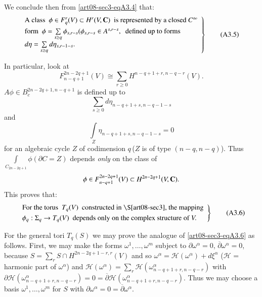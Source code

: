 We conclude then from \eqref{art08-sec3-eqA3.4} that:
\begin{equation*}
\left.
\begin{array}{@{}l}
\text{A class~ } \phi\in F^{r}_{q}(V)\subset H^{r}(V,\bfC)\text{~ is represented by a closed } C^{\infty}\\[4pt]
\text{form~ } \phi=\sum\limits_{s\geq q}\phi_{s,r-s}(\phi_{s,r-s}\in A^{s,r-s},\text{~ defined up to forms}\\[4pt]
d\eta=\sum\limits_{s\geq q}d\eta_{s,r-1-s}. 
\end{array}
\right\}\tag{A3.5}\label{art08-sec3-eqA3.5}
\end{equation*}

In particular, look at 
$$
F^{2n-2q+1}_{n-q+1}(V)\cong \sum\limits_{r\geq 0}H^{n-q+1+r,n-q-r}(V).
$$ 
$A\phi \in B^{2n-2q+1,n-q+1}_{c}$ is defined up to 
$$
\sum\limits_{s\geq 0}d\eta_{n-q+1+s,n-q-1-s}
$$ 
and 
$$
\int\limits_{Z}\eta_{n-q+1+s,n-q-1-s}=0
$$ 
for an algebraic cycle $Z$ of codimension $q$\,($Z$ is of type $(n-q,n-q)$). Thus $\int\limits_{C_{2n-2q+1}}\phi(\partial C=Z)$ depends {\em only} on the class of 
$$
\phi\in F^{2n-2q+1}_{n-q+1}(V)\subset H^{2n-2q+1}(V,\mathbf{C}).
$$ 
This proves that:
\begin{equation*}
\left.
\begin{array}{l}
\text{For the torus~ } T_{q}(V)\text{~ constructed in \S\ref{art08-sec3}, the mapping}\\[3pt]
\phi_{q}:\Sigma_{q}\to T_{q}(V)\text{~ depends only on the complex structure of } V.
\end{array}\right\}\tag{A3.6}\label{art08-sec3-eqA3.6}
\end{equation*}

For the general tori $T_{q}(S)$ we may prove the analogue of \eqref{art08-sec3-eqA3.6} as follows. First, we may make the forms $\omega^{1},\ldots,\omega^{m}$ subject to $\partial \omega^{\alpha}=0$, $\overline{\partial}\omega^{\alpha}=0$, because $S=\sum\limits_{r}S\cap H^{2n-2q+1-r,r}(V)$ and so $\omega^{\alpha}=\mathscr{H}(\omega^{\alpha})+d\xi^{\alpha}$ ($\mathscr{H}$ = harmonic part of $\omega^{\alpha}$) and $\mathscr{H}(\omega^{\alpha})=\sum\limits_{r}\mathscr{H}(\omega^{\alpha}_{n-q+1+r,n-q-r})$ with $\partial \mathscr{H}(\omega^{\alpha}_{n-q+1+r,n-q-r})=0=\overline{\partial}\mathscr{H}(\omega^{\alpha}_{n-q+1+r,n-q-r})$. Thus we may choose a basis $\omega^{1},\ldots,\omega^{m}$ for $S$ with $\partial \omega^{\alpha}=0=\overline{\partial}\omega^{\alpha}$.

